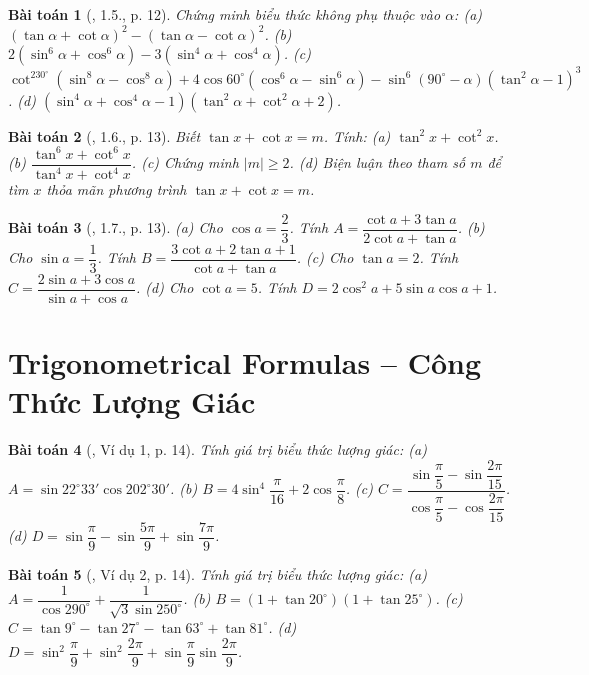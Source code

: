 \documentclass{article}
\newtheorem{baitoan}{Bài toán}
\begin{document}
\begin{baitoan}[\cite{Hung_nang_cao_phat_trien_Toan_11_tap_1}, 1.5., p. 12]
	Chứng minh biểu thức không phụ thuộc vào $\alpha$: (a) $(\tan\alpha + \cot\alpha)^2 - (\tan\alpha - \cot\alpha)^2$. (b) $2(\sin^6\alpha + \cos^6\alpha) - 3(\sin^4\alpha + \cos^4\alpha)$. (c) $\cot^230^\circ(\sin^8\alpha - \cos^8\alpha) + 4\cos60^\circ(\cos^6\alpha - \sin^6\alpha) - \sin^6(90^\circ - \alpha)(\tan^2\alpha - 1)^3$. (d) $(\sin^4\alpha + \cos^4\alpha - 1)(\tan^2\alpha + \cot^2\alpha + 2)$.
\end{baitoan}

\begin{baitoan}[\cite{Hung_nang_cao_phat_trien_Toan_11_tap_1}, 1.6., p. 13]
	Biết $\tan x + \cot x = m$. Tính: (a) $\tan^2x + \cot^2x$. (b) $\dfrac{\tan^6x + \cot^6x}{\tan^4x + \cot^4x}$. (c) Chứng minh $|m|\ge2$. (d) Biện luận theo tham số $m$ để tìm $x$ thỏa mãn phương trình $\tan x + \cot x = m$.
\end{baitoan}

\begin{baitoan}[\cite{Hung_nang_cao_phat_trien_Toan_11_tap_1}, 1.7., p. 13]
	(a) Cho $\cos a = \dfrac{2}{3}$. Tính $A = \dfrac{\cot a + 3\tan a}{2\cot a + \tan a}$. (b) Cho $\sin a = \dfrac{1}{3}$. Tính $B = \dfrac{3\cot a + 2\tan a + 1}{\cot a + \tan a}$. (c) Cho $\tan a = 2$. Tính $C = \dfrac{2\sin a + 3\cos a}{\sin a + \cos a}$. (d) Cho $\cot a = 5$. Tính $D = 2\cos^2a + 5\sin a\cos a + 1$.
\end{baitoan}


\section{Trigonometrical Formulas -- Công Thức Lượng Giác}

\begin{baitoan}[\cite{Hung_nang_cao_phat_trien_Toan_11_tap_1}, Ví dụ 1, p. 14]
	Tính giá trị biểu thức lượng giác: (a) $A = \sin22^\circ33'\cos202^\circ30'$. (b) $B = 4\sin^4\dfrac{\pi}{16} + 2\cos\dfrac{\pi}{8}$. (c) $C = \dfrac{\sin\dfrac{\pi}{5} - \sin\dfrac{2\pi}{15}}{\cos\dfrac{\pi}{5} - \cos\dfrac{2\pi}{15}}$. (d) $D = \sin\dfrac{\pi}{9} - \sin\dfrac{5\pi}{9} + \sin\dfrac{7\pi}{9}$.
\end{baitoan}

\begin{baitoan}[\cite{Hung_nang_cao_phat_trien_Toan_11_tap_1},  Ví dụ 2, p. 14]
	Tính giá trị biểu thức lượng giác: (a) $A = \dfrac{1}{\cos290^\circ} + \dfrac{1}{\sqrt{3}\sin250^\circ}$. (b) $B = (1 + \tan20^\circ)(1 + \tan25^\circ)$. (c) $C = \tan9^\circ - \tan27^\circ - \tan63^\circ + \tan81^\circ$. (d) $D = \sin^2\dfrac{\pi}{9} + \sin^2\dfrac{2\pi}{9} + \sin\dfrac{\pi}{9}\sin\dfrac{2\pi}{9}$. 
\end{baitoan}
\end{document}
